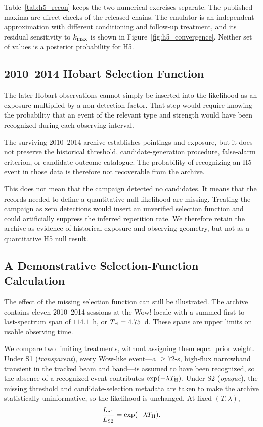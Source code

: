\documentclass[crop]{CSL}
\newcommand{\kmax}{k_{\rm max}}
\begin{document}
Table~\ref{tab:h5_recon} keeps the two numerical exercises separate. The published maxima are direct checks of the released chains. The emulator is an independent approximation with different conditioning and follow-up treatment, and its residual sensitivity to $\kmax$ is shown in Figure~\ref{fig:h5_convergence}. Neither set of values is a posterior probability for H5.

\subsection{2010--2014 Hobart Selection Function}

The later Hobart observations cannot simply be inserted into the likelihood as an exposure multiplied by a non-detection factor. That step would require knowing the probability that an event of the relevant type and strength would have been recognized during each observing interval.

The surviving 2010--2014 archive establishes pointings and exposure, but it does not preserve the historical threshold, candidate-generation procedure, false-alarm criterion, or candidate-outcome catalogue. The probability of recognizing an H5 event in those data is therefore not recoverable from the archive.

This does not mean that the campaign detected no candidates. It means that the records needed to define a quantitative null likelihood are missing. Treating the campaign as zero detections would insert an unverified selection function and could artificially suppress the inferred repetition rate. We therefore retain the archive as evidence of historical exposure and observing geometry, but not as a quantitative H5 null result.

\subsection{A Demonstrative Selection-Function Calculation}
\label{sec:seldemo}

The effect of the missing selection function can still be illustrated. The archive contains eleven 2010--2014 sessions at the Wow! locale with a summed first-to-last-spectrum span of $114.1$~h, or $T_{\rm H}=4.75$~d. These spans are upper limits on usable observing time.

We compare two limiting treatments, without assigning them equal prior weight. Under S1 (\emph{transparent}), every Wow-like event---a $\geq72$-s, high-flux narrowband transient in the tracked beam and band---is assumed to have been recognized, so the absence of a recognized event contributes $\exp(-\lambda T_{\rm H})$. Under S2 (\emph{opaque}), the missing threshold and candidate-selection metadata are taken to make the archive statistically uninformative, so the likelihood is unchanged. At fixed $(T,\lambda)$,
\[
\frac{L_{\rm S1}}{L_{\rm S2}}=\exp(-\lambda T_{\rm H}).
\]
\end{document}
